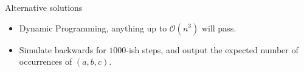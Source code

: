 \begin{frame}
    \frametitle{\problemtitle}
    \begin{block}{Alternative solutions}
        \begin{itemize}
            \item Dynamic Programming, anything up to $\mathcal O(n^3)$ will pass. %
            \pause
            \item Simulate backwards for $1000$-ish steps, and output the expected number of occurrences of $(a, b, c)$.
        \end{itemize}
    \end{block}
    \pause
    \solvestats
\end{frame}
